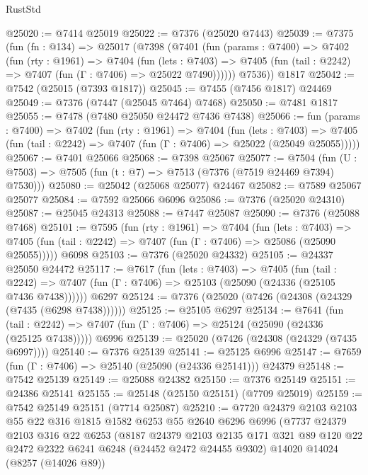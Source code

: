 \begin{lexlean}{RustStd}
\begin{coremodule}
@25020 := @7414 @25019
@25022 := @7376 (@25020 @7443)
@25039 := @7375
    (fun (fn : @134) =>
    @25017
      (@7398
        (@7401
          (fun (params : @7400) =>
          @7402
            (fun (rty : @1961) =>
            @7404
              (fun (lets : @7403) =>
              @7405 (fun (tail : @2242) => @7407 (fun (Γ : @7406) => @25022 @7490))))))
        @7536))
    @1817
@25042 := @7542 (@25015 (@7393 @1817))
@25045 := @7455 (@7456 @1817) @24469
@25049 := @7376 (@7447 (@25045 @7464) @7468)
@25050 := @7481 @1817
@25055 := @7478 (@7480 @25050 @24472 @7436 @7438)
@25066 := fun (params : @7400) =>
  @7402
    (fun (rty : @1961) =>
    @7404
      (fun (lets : @7403) =>
      @7405 (fun (tail : @2242) => @7407 (fun (Γ : @7406) => @25022 (@25049 @25055)))))
@25067 := @7401 @25066
@25068 := @7398 @25067
@25077 := @7504
    (fun (U : @7503) => @7505 (fun (t : @7) => @7513 (@7376 (@7519 @24469 @7394) @7530)))
@25080 := @25042 (@25068 @25077) @24467
@25082 := @7589 @25067 @25077
@25084 := @7592 @25066 @6096
@25086 := @7376 (@25020 @24310)
@25087 := @25045 @24313
@25088 := @7447 @25087
@25090 := @7376 (@25088 @7468)
@25101 := @7595
    (fun (rty : @1961) =>
    @7404
      (fun (lets : @7403) =>
      @7405 (fun (tail : @2242) => @7407 (fun (Γ : @7406) => @25086 (@25090 @25055)))))
    @6098
@25103 := @7376 (@25020 @24332)
@25105 := @24337 @25050 @24472
@25117 := @7617
    (fun (lets : @7403) =>
    @7405
      (fun (tail : @2242) =>
      @7407 (fun (Γ : @7406) => @25103 (@25090 (@24336 (@25105 @7436 @7438))))))
    @6297
@25124 := @7376 (@25020 (@7426 (@24308 (@24329 (@7435 (@6298 @7438))))))
@25125 := @25105 @6297
@25134 := @7641
    (fun (tail : @2242) => @7407 (fun (Γ : @7406) => @25124 (@25090 (@24336 (@25125 @7438)))))
    @6996
@25139 := @25020 (@7426 (@24308 (@24329 (@7435 @6997))))
@25140 := @7376 @25139
@25141 := @25125 @6996
@25147 := @7659 (fun (Γ : @7406) => @25140 (@25090 (@24336 @25141))) @24379
@25148 := @7542 @25139
@25149 := @25088 @24382
@25150 := @7376 @25149
@25151 := @24386 @25141
@25155 := @25148 (@25150 @25151) (@7709 @25019)
@25159 := @7542 @25149 @25151 (@7714 @25087)
@25210 := @7720
    @24379
    @2103
    @2103
    @55
    @22
    @316
    @1815
    @1582
    @6253
    @55
    @2640
    @6296
    @6996
    (@7737
      @24379
      @2103
      @316
      @22
      @6253
      (@8187
        @24379
        @2103
        @2135
        @171
        @321
        @89
        @120
        @22
        @2472
        @2322
        @6241
        @6248
        (@24452 @2472 @24455 @9302)
        @14020
        @14024
        (@8257 (@14026 @89))

\end{coremodule}
\end{lexlean}
